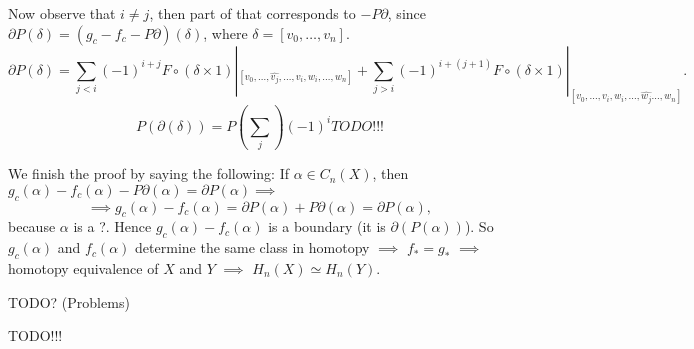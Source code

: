 \documentclass[12pt]{article}					%
\begin{document}
\begin{tvrzeni}
\begin{dukazin}
		Now observe that $i ≠ j$, then part of that corresponds to $-P\partial$, since $\partial P(δ) = (g_c - f_c - P\partial)(δ)$, where $δ = [v_0, …, v_n]$.
		$$ \partial P(δ) = \sum_{j < i} (-1)^{i + j} F ∘ (δ \times 1)|_{[v_0, …, \hat{v_j}, …, v_i, w_i, …, w_n]} + \sum_{j > i} (-1)^{i + (j + 1)} F ∘ (δ \times 1)|_{[v_0, …, v_i, w_i, …, \hat{w_j} …, w_n]}. $$
		$$ P(\partial(δ)) = P(\sum_j)(-1)^i TODO!!! $$

		We finish the proof by saying the following: If $α \in C_n(X)$, then $g_c(α) - f_c(α) - P\partial(α) = \partial P(α) \implies$
		$$ \implies g_c(α) - f_c(α) = \partial P(α) + P \partial(α) = \partial P(α), $$
		because $α$ is a ?. Hence $g_c(α) - f_c(α)$ is a boundary (it is $\partial(P(α))$). So $g_c(α)$ and $f_c(α)$ determine the same class in homotopy $\implies$ $f_* = g_*$ $\implies$ homotopy equivalence of $X$ and $Y$ $\implies$ $H_n(X) \simeq H_n(Y)$.
	\end{dukazin}
\end{tvrzeni}


TODO? (Problems)


TODO!!!
\end{document}
